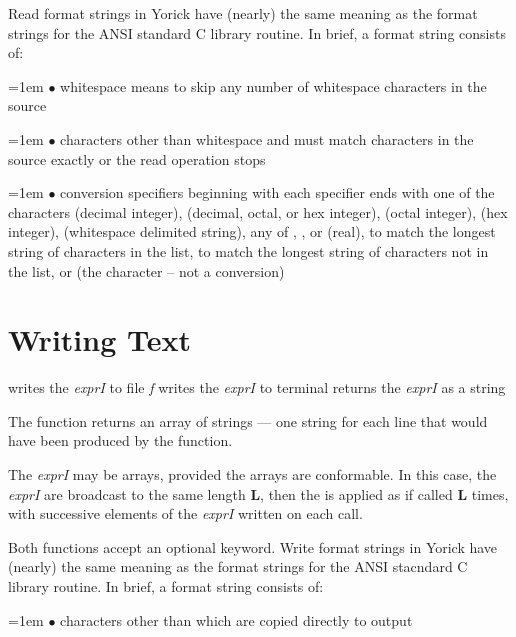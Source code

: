 Read format strings in Yorick have (nearly) the same meaning as the
format strings for the ANSI standard C library  routine.  In
brief, a format string consists of:

\hangindent=1em
$\bullet$ whitespace \hfil\break
means to skip any number of whitespace characters in the source

\hangindent=1em
$\bullet$ characters other than whitespace and \kbd{\%} \hfil\break
must match characters in the source exactly or the read operation stops

\hangindent=1em
$\bullet$ conversion specifiers beginning with \kbd{\%} \hfil\break
each specifier ends with one of the characters  (decimal integer),
 (decimal, octal, or hex integer),  (octal integer),
 (hex integer),  (whitespace delimited string),
any of , , or  (real),
\kbd{[{\it xxx}]} to match the longest string of characters in the list,
\kbd{[\^{}{\it xxx}]} to match the longest string of characters not in
the list, or \kbd{\%} (the \kbd{\%} character -- not a conversion)

\shortcopyrightnotice

\section{Writing Text}

     {writes the {\it exprI\/} to file {\it f}}
     {writes the {\it exprI\/} to terminal}
     {returns the {\it exprI\/} as a string}

The  function returns an array of strings --- one string
for each line that would have been produced by the  function.

The {\it exprI\/} may be arrays, provided the arrays are conformable.
In this case, the {\it exprI\/} are broadcast to the same length {\bf L},
then the  is applied as if called {\bf L} times, with
successive elements of the {\it exprI\/} written on each call.

Both functions accept an optional  keyword.  Write format
strings in Yorick have (nearly) the same meaning as the format strings
for the ANSI stacndard C library  routine.  In brief, a format
string consists of:

\hangindent=1em
$\bullet$ characters other than \kbd{\%} \hfil\break
which are copied directly to output

